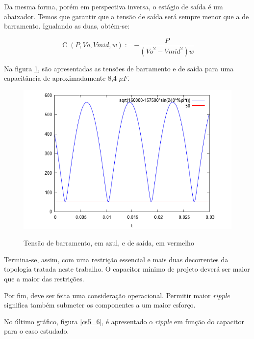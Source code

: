 \documentclass[
        12pt,
        openany, %
        oneside, %
        a4paper,			
        english,			
        brazil
        ]{abntbibufjf}
\begin{document}

Da mesma forma, porém em perspectiva inversa, o estágio de saída é um abaixador. Temos que garantir que a tensão de saída será sempre menor que a de barramento. Igualando as duas, obtém-se:

\begin{equation}
\operatorname{C}\left( P,\mathit{Vo},\mathit{Vmid},w\right) :=-\frac{P}{\left( {{\mathit{Vo}}^{2}}-{{\mathit{Vmid}}^{2}}\right) w}\mbox{}
\end{equation}


Na figura \ref{cs5_5}, são apresentadas as tensões de barramento e de saída para uma capacitância de aproximadamente 8,4 $\mu F$.

\begin{figure}[!h]
	\centering
	\caption{Tensão de barramento, em azul, e de saída, em vermelho}
	\includegraphics[width=.95\linewidth,height=.80\textheight,keepaspectratio]{../GRAFICOS/cs5_img/cs5_5}
	\label{cs5_5}
\end{figure}

Termina-se, assim, com uma restrição essencial e mais duas decorrentes da topologia tratada neste trabalho. O capacitor mínimo de projeto deverá ser maior que a maior das restrições.

Por fim, deve ser feita uma consideração operacional. Permitir maior \textit{ripple} significa também submeter os componentes a um maior esforço.

No último gráfico, figura \ref{cs5_6}, é apresentado o \textit{ripple} em função do capacitor para o caso estudado.
\end{document}

